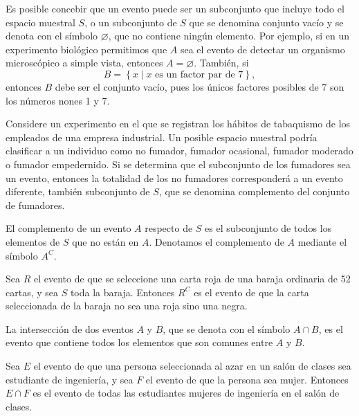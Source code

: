 Es posible concebir que un evento puede ser un subconjunto que incluye todo el espacio muestral $S$, o un subconjunto de $S$ que se denomina conjunto vacío y se denota con el símbolo $\varnothing$, que no contiene ningún elemento. Por ejemplo, si en un experimento biológico permitimos que $A$ sea el evento de detectar un organismo microscópico a simple vista, entonces $A = \varnothing$. También, si
$$B = \left\{ x \mid x \text{ es un factor par de } 7 \right\},$$
entonces $B$ debe ser el conjunto vacío, pues los únicos factores posibles de 7 son los números nones 1 y 7.

Considere un experimento en el que se registran los hábitos de tabaquismo de los empleados de una empresa industrial. Un posible espacio muestral podría clasificar a un individuo como no fumador, fumador ocasional, fumador moderado o fumador empedernido. Si se determina que el subconjunto de los fumadores sea un evento, entonces la totalidad de los no fumadores corresponderá a un evento diferente, también subconjunto de $S$, que se denomina complemento del conjunto de fumadores.

\begin{definicion}{}{}
    El complemento de un evento $A$ respecto de $S$ es el subconjunto de todos los elementos de $S$ que no están en $A$. Denotamos el complemento de $A$ mediante el símbolo $A^C$.
\end{definicion}

\newpage

\begin{examplebox}{}{}
    Sea $R$ el evento de que se seleccione una carta roja de una baraja ordinaria de 52 cartas, y sea $S$ toda la baraja. Entonces $R^C$ es el evento de que la carta seleccionada de la baraja no sea una roja sino una negra.
\end{examplebox}

\begin{definicion}{}{}
    La intersección de dos eventos $A$ y $B$, que se denota con el símbolo $A \cap B$, es el evento que contiene todos los elementos que son comunes entre $A$ y $B$.
\end{definicion}

\begin{examplebox}{}{}
    Sea $E$ el evento de que una persona seleccionada al azar en un salón de clases sea estudiante de ingeniería, y sea $F$ el evento de que la persona sea mujer. Entonces $E \cap F$ es el evento de todas las estudiantes mujeres de ingeniería en el salón de clases.
\end{examplebox}

